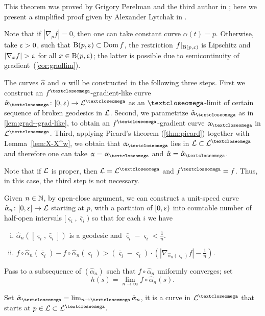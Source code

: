 This theorem was proved by Grigory Perelman and the third author in \cite{perelman-petrunin:qg};
here we present a simplified proof given by Alexander Lytchak in \cite{lytchak:open-map}.

Note that if $|\nabla_p f|=0$, then one can take constant curve $\alpha(t)=p$.
Otherwise, take $\upvarepsilon>0$, 
such that $\oBall(p,\eps)\subset\Dom f$,
the restriction $f|_{\mathrm{B}{}(p,\upvarepsilon)}$ is Lipschitz
and $|\nabla_x f|>\eps$ for all $x\in \oBall(p,\eps)$;
the latter is possible due to semicontinuity of \textbar gradient\textbar\ (\ref{cor:gradlim}).

The curves $\hat\alpha$ and $\alpha$ will be constructed in the following three steps.
First we construct an $f^\o$-gradient-like curve $\hat\alpha_\o\:[0,\eps)\to\spc{L}^\o$ as an $\o$-limit of certain sequence of broken geodesics in $\mathcal{L}$.
Second, we parametrize $\hat\alpha_\o$ as in \ref{lem:grad--grad-like}, to obtain an $f^\o$-gradient curve $\alpha_\o$ in $\spc{L}^\o$.
Third, applying Picard's theorem (\ref{thm:picard}) together with Lemma~\ref{lem:X-X^w}, we obtain that $\alpha_\o$ lies in $\spc{L}\subset \spc{L}^\o$ and therefore one can take $\alpha=\alpha_\o$ and $\hat\alpha=\hat\alpha_\o$.

Note that if $\mathcal{L}$ is proper, then $\spc{L}=\spc{L}^\o$ and $f^\o=f$.
Thus, in this case, the third step is not necessary.

Given $n\in \NN$, 
by open-close argument,
we can construct a unit-speed curve $\hat\alpha_n\:[0,\eps] \to \spc{L}$ starting at $p$, with a partition of $[0,\upvarepsilon)$ into countable number of half-open intervals $[\varsigma_i,\bar\varsigma_i)$ 
so that for each $i$ we have 
\begin{enumerate}[(i)]
\item $\hat\alpha_n([\varsigma_i,\bar\varsigma_i])$ is a geodesic and $\bar\varsigma_i-\varsigma_i<\tfrac{1}{n}$.
\item\label{alm-grad} 
$f\circ\hat\alpha_n(\bar\varsigma_i)-f\circ\hat\alpha_n(\varsigma_i)
>
(\bar\varsigma_i-\varsigma_i)
\cdot
(|\nabla_{\hat\alpha_n(\varsigma_i)}f|-\tfrac{1}{n}).$
\end{enumerate}

Pass to a subsequence of $(\hat\alpha_n)$ such that $f\circ\hat\alpha_n$ uniformly converges; set 
\[h(s)=\lim_{n\to\infty}f\circ\hat\alpha_n(s).\]

Set $\hat\alpha_\o=\lim_{n\to\o}\hat\alpha_{n}$, 
it is a curve in $\spc{L}^\o$ that starts at $p\in \spc{L}\subset \spc{L}^\o$.

